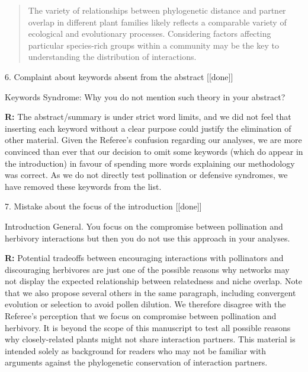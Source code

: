 \documentclass[12pt]{letter}
\newenvironment{refquote}{\bigskip \begin{it}}{\end{it}\smallskip}
\begin{document}
		\begin{quotation}
		    \item The variety of relationships between phylogenetic distance and partner overlap in different plant families likely reflects a comparable variety of ecological and evolutionary processes. Considering factors affecting particular species-rich groups within a community may be the key to understanding the distribution of interactions.
		\end{quotation}


	6. Complaint about keywords absent from the abstract [[done]]

		\begin{refquote}
		Keywords
		Syndrome:  Why you do not mention such theory in your abstract?
		\end{refquote}


		\textbf{R:} The abstract/summary is under strict word limits, and we did not feel that inserting each keyword without a clear purpose could justify the elimination of other material. Given the Referee's confusion regarding our analyses, we are more convinced than ever that our decision to omit some keywords (which do appear in the introduction) in favour of spending more words explaining our methodology was correct. As we do not directly test pollination or defensive syndromes, we have removed these keywords from the list.


	7. Mistake about the focus of the introduction [[done]]

		\begin{refquote}
		Introduction
		General. You focus on the compromise between pollination and herbivory interactions but then you do not use this approach in your analyses.
		\end{refquote}


		\textbf{R:} Potential tradeoffs between encouraging interactions with pollinators and discouraging herbivores are just one of the possible reasons why networks may not display the expected relationship between relatedness and niche overlap. Note that we also propose several others in the same paragraph, including convergent evolution or selection to avoid pollen dilution. We therefore disagree with the Referee's perception that we focus on compromise between pollination and herbivory. It is beyond the scope of this manuscript to test all possible reasons why closely-related plants might not share interaction partners. This material is intended solely as background for readers who may not be familiar with arguments against the phylogenetic conservation of interaction partners.
\end{document}
